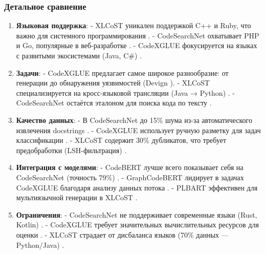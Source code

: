 \documentclass[14pt]{article}
\theoremstyle{definition}
\begin{document}
\subsubsection{Детальное сравнение}
\begin{enumerate}
\item \textbf{Языковая поддержка}:
- XLCoST уникален поддержкой C++ и Ruby, что важно для системного программирования \cite{zhu2022}.
- CodeSearchNet охватывает PHP и Go, популярные в веб-разработке \cite{husain2019codesearchnet}.
- CodeXGLUE фокусируется на языках с развитыми экосистемами (Java, C\#) \cite{lu2021codexglue}.

\item \textbf{Задачи}:
- CodeXGLUE предлагает самое широкое разнообразие: от генерации до обнаружения уязвимостей (Devign \cite{zhou2022devign}).
- XLCoST специализируется на кросс-языковой трансляции (Java → Python) \cite{zhu2022}.
- CodeSearchNet остаётся эталоном для поиска кода по тексту \cite{zhang2020retrieval}.

\item \textbf{Качество данных}:
- В CodeSearchNet до 15\% шума из-за автоматического извлечения docstrings \cite{allamanis2019adverse}.
- CodeXGLUE использует ручную разметку для задач классификации \cite{lu2021codexglue}.
- XLCoST содержит 30\% дубликатов, что требует предобработки (LSH-фильтрация) \cite{zhu2022}.

\item \textbf{Интеграция с моделями}:
- CodeBERT лучше всего показывает себя на CodeSearchNet (точность 79\%) \cite{feng2020codebert}.
- GraphCodeBERT лидирует в задачах CodeXGLUE благодаря анализу данных потока \cite{guo2021graphcodebert}.
- PLBART эффективен для мультиязычной генерации в XLCoST \cite{ahmad2021plbart}.

\item \textbf{Ограничения}:
- CodeSearchNet не поддерживает современные языки (Rust, Kotlin) \cite{karampatsis2020big}.
- CodeXGLUE требует значительных вычислительных ресурсов для оценки \cite{lu2021codexglue}.
- XLCoST страдает от дисбаланса языков (70\% данных — Python/Java) \cite{zhu2022}.
\end{enumerate}
\end{document}
